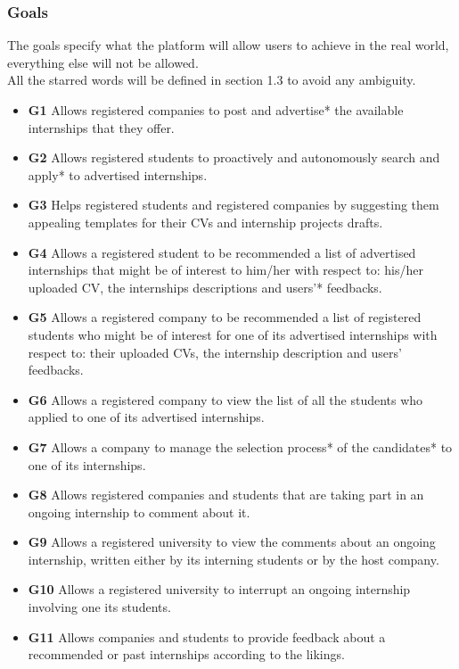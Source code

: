 \documentclass[a4paper,12pt]{article}
\begin{document}
\subsubsection{Goals}
The goals specify what the platform will allow users to achieve in the real world, everything else will not be allowed. 
\\All the starred words will be defined in section 1.3 to avoid any ambiguity.
\begin{itemize}
  \item \textbf{G1} Allows registered companies to post and advertise* the available internships that they offer.
  \item \textbf{G2} Allows registered students to proactively and autonomously search and apply* to advertised internships.
  \item \textbf{G3} Helps registered students and registered companies by suggesting them appealing templates for their CVs and internship projects drafts.
  \item \textbf{G4} Allows a registered student to be recommended a list of advertised internships that might be of interest to him/her with respect to: his/her uploaded CV, the internships descriptions and users'* feedbacks.
  \item \textbf{G5} Allows a registered company to be recommended a list of registered students who might be of interest for one of its advertised internships with respect to: their uploaded CVs, the internship description and users' feedbacks.
  \item \textbf{G6} Allows a registered company to view the list of all the students who applied to one of its advertised internships.
  \item \textbf{G7} Allows a company to manage the selection process* of the candidates* to one of its internships.
  \item \textbf{G8} Allows registered companies and students that are taking part in an ongoing internship to comment about it.
  \item \textbf{G9} Allows a registered university to view the comments about an ongoing internship, written either by its interning students or by the host company.
  \item \textbf{G10} Allows a registered university to interrupt an ongoing internship involving one its students.
  \item \textbf{G11} Allows companies and students to provide feedback about a recommended or past internships according to the likings.

\end{itemize}
\end{document}
